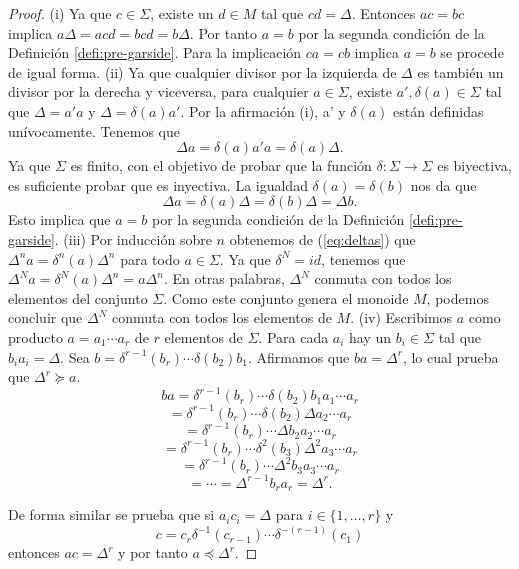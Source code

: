 \documentclass[12pt]{book}
\theoremstyle{definition}
\begin{document}
\begin{proof} (i) Ya que $c\in\Sigma$, existe un $d\in M$ tal que $cd=\Delta$. Entonces $ac=bc$ implica $a\Delta = acd=bcd=b\Delta$. Por tanto $a=b$ por la segunda condición de la Definición \ref{defi:pre-garside}. Para la implicación $ca=cb$ implica $ a=b$ se procede de igual forma.
\newline
\newline
(ii) Ya que cualquier divisor por la izquierda de $\Delta$ es también un divisor por la derecha y viceversa, para cualquier $a\in\Sigma$, existe $a',\delta(a)\in\Sigma$ tal que $\Delta =a'a$ y $\Delta = \delta(a)a'$. Por la afirmación (i), a' y $\delta(a)$ están definidas unívocamente. Tenemos que
\begin{equation}
\Delta a=\delta(a)a'a=\delta(a)\Delta.
\label{eq:deltas}
\end{equation}
Ya que $\Sigma$ es finito, con el objetivo de probar que la función $\delta:\Sigma\rightarrow\Sigma$ es biyectiva, es suficiente probar que es inyectiva. La igualdad $\delta(a)=\delta(b)$ nos da que
$$\Delta a= \delta(a)\Delta = \delta(b)\Delta = \Delta b.$$
Esto implica que $a=b$ por la segunda condición de la Definición \ref{defi:pre-garside}.
\newline
\newline
(iii) Por inducción sobre $n$ obtenemos de (\ref{eq:deltas}) que $\Delta^na=\delta^n(a)\Delta^n$ para todo $a\in\Sigma$. Ya que $\delta^N=id$, tenemos que $\Delta^N a=\delta^N(a)\Delta^n=a\Delta^n$. En otras palabras, $\Delta^N$ conmuta con todos los elementos del conjunto $\Sigma$. Como este conjunto genera el monoide $M$, podemos concluir que $\Delta^N$ conmuta con todos los elementos de $M$.
\newline
\newline
(iv) Escribimos $a$ como producto $a=a_1\cdots a_r$ de $r$ elementos de $\Sigma$. Para cada $a_i$ hay un $b_i\in\Sigma$ tal que $b_ia_i=\Delta$. Sea $b=\delta^{r-1}(b_r)\cdots\delta(b_2)b_1$. Afirmamos que $ba=\Delta^r$, lo cual prueba que $\Delta^r\succeq a$.
$$ba=\delta^{r-1}(b_r)\cdots\delta(b_2)b_1a_1\cdots a_r$$
$$=\delta^{r-1}(b_r)\cdots\delta(b_2)\Delta a_2\cdots a_r$$
$$=\delta^{r-1}(b_r)\cdots\Delta b_2a_2\cdots a_r$$
$$=\delta^{r-1}(b_r)\cdots\delta^2(b_3)\Delta^2 a_3\cdots a_r$$
$$=\delta^{r-1}(b_r)\cdots\Delta^2 b_3a_3\cdots a_r$$
$$=\cdots= \Delta^{r-1}b_ra_r=\Delta^r.$$

De forma similar se prueba que si $a_ic_i=\Delta$ para $i\in\{1,\ldots,r\}$ y
$$c=c_r\delta^{-1}(c_{r-1})\cdots\delta^{-(r-1)}(c_1)$$
entonces $ac=\Delta^r$ y por tanto $a\preceq\Delta^r$.
\end{proof}
\end{document}
